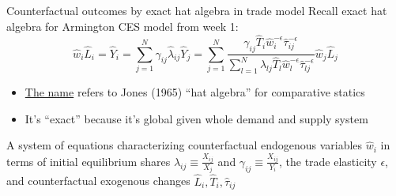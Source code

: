 \documentclass[11pt,notes=hide,aspectratio=169]{beamer}
\begin{document}
\begin{frame}{Counterfactual outcomes by exact hat algebra in trade model}
Recall exact hat algebra for Armington CES model from week 1:
\begin{equation*}
\hat{w}_i \hat{L}_i
=
\hat{Y}_{i}
=
\sum_{j=1}^{N} \gamma_{ij} \hat{\lambda}_{ij} \hat{Y}_{j}
= 
\sum_{j=1}^{N}
\frac{\gamma_{ij} \hat{T}_{i} \hat{w}_{i}^{-\epsilon}\hat{\tau}_{ij}^{-\epsilon}}
{\sum_{l=1}^{N} \lambda_{lj} \hat{T}_{l} \hat{w}_l^{-\epsilon}\hat{\tau}_{lj}^{-\epsilon}}
\hat{w}_{j} \hat{L}_{j}
\end{equation*}
\vspace{-3mm}
\begin{itemize}
\item \href{https://tradediversion.net/2018/05/07/on-hat-algebra/}{The name} refers to Jones (1965) ``hat algebra'' for comparative statics
\item It's ``exact'' because it's global given whole demand and supply system
\end{itemize}
\vspace{3mm}
A system of equations characterizing counterfactual endogenous variables $\hat{w}_i$
in terms of 
initial equilibrium shares $\lambda_{ij} \equiv \frac{X_{ij}}{X_j}$ and $\gamma_{ij} \equiv \frac{X_{ij}}{Y_i}$,
the trade elasticity $\epsilon$,
and
counterfactual exogenous changes $\hat{L}_{i}, \hat{T}_i, \hat{\tau}_{ij}$
\end{frame}
\end{document}
